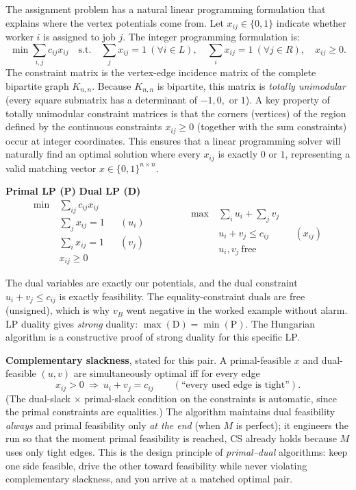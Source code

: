 The assignment problem has a natural linear programming formulation that explains where the vertex potentials come from. Let $x_{ij}\in\{0,1\}$ indicate whether worker $i$ is assigned to job $j$. The integer programming formulation is:
\[
\min \sum_{i,j} c_{ij}x_{ij}
\quad\text{s.t.}\quad
\sum_j x_{ij}=1\ (\forall i\in L),\quad \sum_i x_{ij}=1\ (\forall j\in R),\quad x_{ij}\ge 0.
\]
The constraint matrix is the vertex-edge incidence matrix of the complete bipartite graph $K_{n,n}$. Because $K_{n,n}$ is bipartite, this matrix is \emph{totally unimodular} (every square submatrix has a determinant of $-1, 0,$ or $1$). A key property of totally unimodular constraint matrices is that the corners (vertices) of the region defined by the continuous constraints $x_{ij} \ge 0$ (together with the sum constraints) occur at integer coordinates. This ensures that a linear programming solver will naturally find an optimal solution where every $x_{ij}$ is exactly $0$ or $1$, representing a valid matching vector $x \in \{0,1\}^{n\times n}$.

\begin{focusbox}
\textbf{Primal LP (P)} \hfill \textbf{Dual LP (D)}
\[
\begin{aligned}
\min\ & \textstyle\sum_{ij} c_{ij}x_{ij}\\
& \textstyle\sum_j x_{ij}=1 && (u_i)\\
& \textstyle\sum_i x_{ij}=1 && (v_j)\\
& x_{ij}\ge 0
\end{aligned}
\qquad\qquad
\begin{aligned}
\max\ & \textstyle\sum_i u_i + \sum_j v_j\\
& u_i + v_j \le c_{ij} && (x_{ij})\\
& u_i, v_j\ \text{free}
\end{aligned}
\]
\end{focusbox}

The dual variables are exactly our potentials, and the dual constraint $u_i+v_j\le c_{ij}$ is exactly feasibility. The equality-constraint duals are free (unsigned), which is why $v_B$ went negative in the worked example without alarm. LP duality gives \emph{strong} duality: $\max(\mathrm{D})=\min(\mathrm{P})$. The Hungarian algorithm is a constructive proof of strong duality for this specific LP.

\begin{whybox}
\textbf{Complementary slackness}, stated for this pair. A primal-feasible $x$ and dual-feasible $(u,v)$ are simultaneously optimal iff for every edge
\[
  x_{ij} > 0 \ \Longrightarrow\ u_i+v_j = c_{ij}
  \qquad(\text{``every used edge is tight''}).
\]
(The dual-slack $\times$ primal-slack condition on the constraints is automatic, since the primal constraints are equalities.) The algorithm maintains dual feasibility \emph{always} and primal feasibility only \emph{at the end} (when $M$ is perfect); it engineers the run so that the moment primal feasibility is reached, CS already holds because $M$ uses only tight edges. This is the design principle of \emph{primal--dual} algorithms: keep one side feasible, drive the other toward feasibility while never violating complementary slackness, and you arrive at a matched optimal pair.
\end{whybox}

